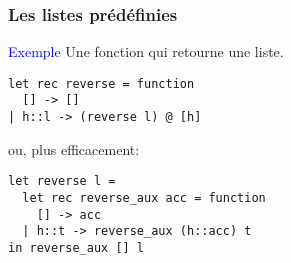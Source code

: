 %
\begin{frame}[containsverbatim]
\frametitle{Les listes prédéfinies}

\textcolor{blue}{Exemple} Une  fonction qui retourne une liste.

{\small
\begin{verbatim}
let rec reverse = function
  [] -> []
| h::l -> (reverse l) @ [h]
\end{verbatim}
}

\bigskip

ou, plus efficacement:
{\small
\begin{verbatim}
let reverse l = 
  let rec reverse_aux acc = function
    [] -> acc
  | h::t -> reverse_aux (h::acc) t
in reverse_aux [] l
\end{verbatim}
}

\end{frame}
